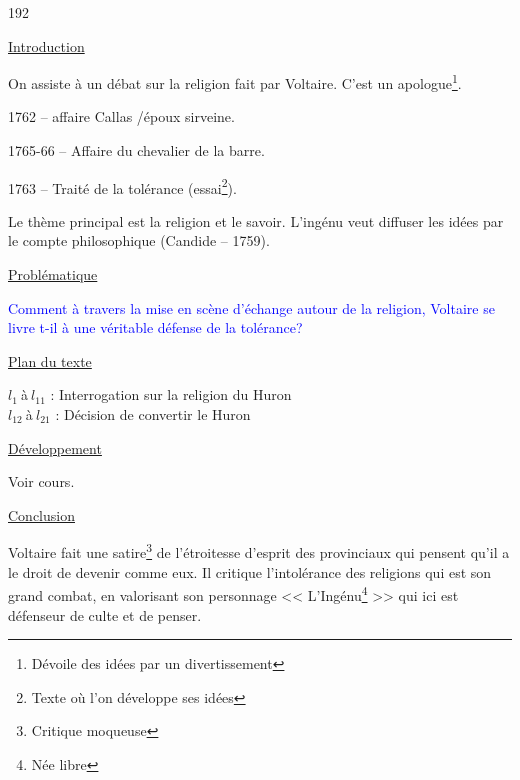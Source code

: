 \documentclass[12pt,a4paper]{article}
\begin{document}
		\begin{dingautolist}{192}

		\item \underline{Introduction} \par
			On assiste à un débat sur la religion fait par Voltaire. C'est un apologue\footnote{Dévoile des idées par un divertissement}.\par
		1762 -- affaire Callas /époux sirveine.\par
		1765-66 -- Affaire du chevalier de la barre.\par
		1763 -- Traité de la tolérance (essai\footnote{Texte où l'on développe ses idées}).\par
		Le thème principal est la religion et le savoir. L'ingénu veut diffuser les idées par le compte philosophique (Candide -- 1759).

		\item \underline{Probl\'ematique }\par
			\textcolor{blue}{Comment à travers la mise en scène d'échange autour de la religion, Voltaire se livre t-il à une véritable défense de la tolérance? }

		\item \underline{Plan du texte} \par
			$l_{1}~$\`a$~l_{11}$ : Interrogation sur la religion du Huron\\ 
			$l_{12}~$\`a$~l_{21}$ : Décision de convertir le Huron
		\item \underline{D\'eveloppement} \par
				Voir cours.

		\item \underline{Conclusion} \par
			Voltaire fait une satire\footnote{Critique moqueuse} de l'étroitesse d'esprit des provinciaux qui pensent qu'il a le droit de devenir comme eux. Il critique l'intolérance des religions qui est son grand combat, en valorisant son personnage << L'Ingénu\footnote{Née libre} >> qui ici est défenseur de culte et de penser. 




		\end{dingautolist}
		 \newpage
\end{document}
